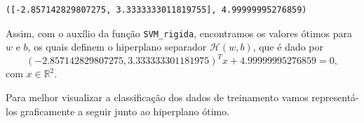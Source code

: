 \documentclass[12pt,a4paper]{scrartcl}
\makeatletter
\def\RR{\mathds{R}}
\theoremstyle{definition}%
\newcommand{\boxspacing}{\kern\kvtcb@left@rule\kern\kvtcb@boxsep}
\newcommand{\prompt}[4]{
        \ttfamily\llap{{\color{#2}[#3]:\hspace{3pt}#4}}\vspace{-\baselineskip}
    }
\makeatother
\begin{document}
%
%

            \begin{tcolorbox}[breakable, size=fbox, boxrule=.5pt, pad at break*=1mm, opacityfill=0]
\prompt{Out}{outcolor}{8}{\boxspacing}
\begin{Verbatim}[commandchars=\\\{\}]
([-2.857142829807275, 3.3333333011819755], 4.99999995276859)
\end{Verbatim}
\end{tcolorbox}
        
Assim, com o auxílio da função \texttt{SVM\_rigida}, encontramos os
valores ótimos para $w$ e $b$, os quais definem o hiperplano
separador $\mathcal{H}(w,b)$, que é dado por
\[
(-2.857142829807275, 3.333333301181975)^{T} x + 4.99999995276859 = 0,
\]
com $x \in \RR^{2}$.

Para melhor visualizar a classificação dos dados de treinamento vamos
representá-los graficamente a seguir junto ao hiperplano ótimo.
\end{document}
